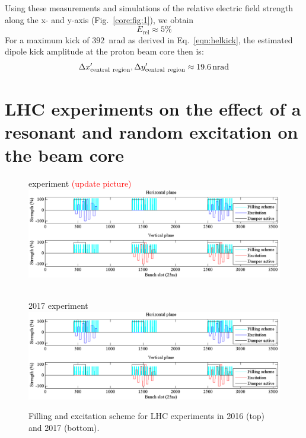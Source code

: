 \documentclass[%
 reprint,
 amsmath,amssymb,
 aps,
prstab,
]{revtex4-1}
\begin{document}
Using these measurements and simulations of the relative electric field strength along the x- and y-axis (Fig.~\ref{core:fig:1}), we obtain
\begin{equation}
	E_{\mathrm{rel}}\approx 5\%
\end{equation}
For a maximum kick of $392$~nrad as derived in Eq.~\ref{eqn:helkick}, the estimated dipole kick amplitude at the proton beam core then is:
\begin{equation}\label{eqn:kick_central}
\Delta x'_{\rm{central \ region}}, \Delta y'_{\rm{central \ region}} \approx \SI{19.6}{nrad}
\end{equation}

\section{LHC experiments on the effect of a resonant and random excitation on the beam core\label{sec:exp}}
\begin{figure}
	\begin{minipage}[t]{1.0\linewidth}
		 experiment \textcolor{red}{(update picture)}\\
		\includegraphics[width=0.7\linewidth]{bunchfilling.png}	
	\end{minipage}
	\begin{minipage}[t]{1.0\linewidth}
		\centering
		$ $\\
		2017 experiment\\
		\includegraphics[width=0.7\linewidth]{bunchfilling.png}	
	\end{minipage}
	\caption{\label{fig:fill} Filling and excitation scheme for LHC experiments in 2016 (top) and 2017 (bottom).}
\end{figure}
\end{document}
